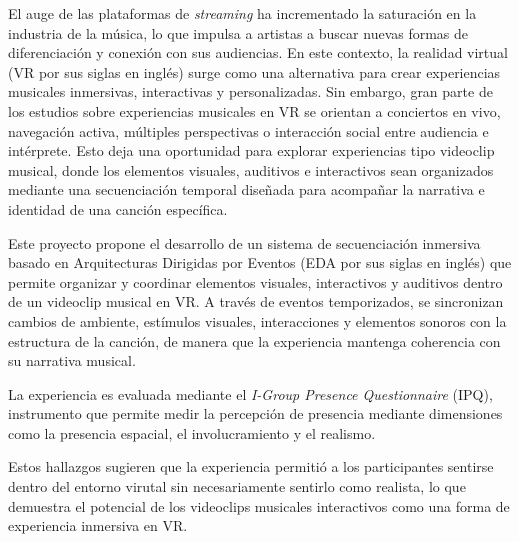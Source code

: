 El auge de las plataformas de \emph{streaming} ha incrementado la saturación en la industria de la música, lo que impulsa a artistas a buscar nuevas formas de diferenciación y conexión con sus audiencias. En este contexto, la realidad virtual (VR por sus siglas en inglés) surge como una alternativa para crear experiencias musicales inmersivas, interactivas y personalizadas. Sin embargo, gran parte de los estudios sobre experiencias musicales en VR se orientan a conciertos en vivo, navegación activa, múltiples perspectivas o interacción social entre audiencia e intérprete. Esto deja una oportunidad para explorar experiencias tipo videoclip musical, donde los elementos visuales, auditivos e interactivos sean organizados mediante una secuenciación temporal diseñada para acompañar la narrativa e identidad de una canción específica.

Este proyecto propone el desarrollo de un sistema de secuenciación inmersiva basado en Arquitecturas Dirigidas por Eventos (EDA por sus siglas en inglés) que permite organizar y coordinar elementos visuales, interactivos y auditivos dentro de un videoclip musical en VR. A través de eventos temporizados, se sincronizan cambios de ambiente, estímulos visuales, interacciones y elementos sonoros con la estructura de la canción, de manera que la experiencia mantenga coherencia con su narrativa musical.

La experiencia es evaluada mediante el \emph{I-Group Presence Questionnaire} (IPQ), instrumento que permite medir la percepción de presencia mediante dimensiones como la presencia espacial, el involucramiento y el realismo. 

Estos hallazgos sugieren que la experiencia permitió a los participantes sentirse dentro del entorno virutal sin necesariamente sentirlo como realista, lo que demuestra el potencial de los videoclips musicales interactivos como una forma de experiencia inmersiva en VR.